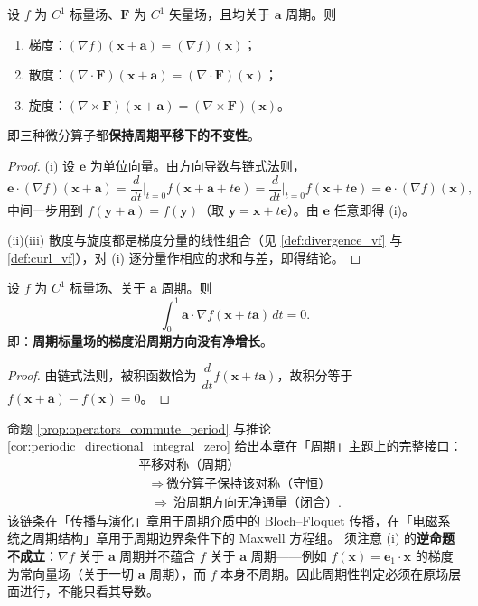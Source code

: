 \begin{proposition}[三种微分算子与周期平移交换]\label{prop:operators_commute_period}
设 $f$ 为 $C^1$ 标量场、$\mathbf F$ 为 $C^1$ 矢量场，且均关于 $\mathbf a$ 周期。则
\begin{enumerate}[label=(\roman*)]
    \item 梯度：$(\nabla f)(\mathbf x+\mathbf a)=(\nabla f)(\mathbf x)$；
    \item 散度：$(\nabla\cdot\mathbf F)(\mathbf x+\mathbf a)=(\nabla\cdot\mathbf F)(\mathbf x)$；
    \item 旋度：$(\nabla\times\mathbf F)(\mathbf x+\mathbf a)=(\nabla\times\mathbf F)(\mathbf x)$。
\end{enumerate}
即三种微分算子都\textbf{保持周期平移下的不变性}。
\end{proposition}

\begin{proof}
(i) 设 $\mathbf e$ 为单位向量。由方向导数与链式法则，
\[
\mathbf e\cdot(\nabla f)(\mathbf x+\mathbf a)
=\frac{d}{dt}\Big|_{t=0}f(\mathbf x+\mathbf a+t\mathbf e)
=\frac{d}{dt}\Big|_{t=0}f(\mathbf x+t\mathbf e)
=\mathbf e\cdot(\nabla f)(\mathbf x),
\]
中间一步用到 $f(\mathbf y+\mathbf a)=f(\mathbf y)$（取 $\mathbf y=\mathbf x+t\mathbf e$）。由 $\mathbf e$ 任意即得 (i)。

(ii)(iii) 散度与旋度都是梯度分量的线性组合（见 \cref{def:divergence_vf} 与 \cref{def:curl_vf}），对 (i) 逐分量作相应的求和与差，即得结论。
\end{proof}

\begin{corollary}[沿周期方向的线积分为零]\label{cor:periodic_directional_integral_zero}
设 $f$ 为 $C^1$ 标量场、关于 $\mathbf a$ 周期。则
\[
\int_0^{1}\mathbf a\cdot\nabla f(\mathbf x+t\mathbf a)\,dt=0 .
\]
即：\textbf{周期标量场的梯度沿周期方向没有净增长}。
\end{corollary}

\begin{proof}
由链式法则，被积函数恰为 $\dfrac{d}{dt}f(\mathbf x+t\mathbf a)$，故积分等于 $f(\mathbf x+\mathbf a)-f(\mathbf x)=0$。
\end{proof}

\begin{remark}[与「周期」主题的接口]\label{rem:vf_period_interface}
命题 \ref{prop:operators_commute_period} 与推论 \ref{cor:periodic_directional_integral_zero} 给出本章在「周期」主题上的完整接口：
\[
\begin{aligned}
&\text{平移对称（周期）}\\
&\quad\Longrightarrow\ \text{微分算子保持该对称（守恒）}\\
&\quad\Longrightarrow\ \text{沿周期方向无净通量（闭合）}.
\end{aligned}
\]
该链条在「传播与演化」章用于周期介质中的 Bloch--Floquet 传播，在「电磁系统之周期结构」章用于周期边界条件下的 Maxwell 方程组。
须注意 (i) 的\textbf{逆命题不成立}：$\nabla f$ 关于 $\mathbf a$ 周期并不蕴含 $f$ 关于 $\mathbf a$ 周期——例如 $f(\mathbf x)=\mathbf e_1\cdot\mathbf x$ 的梯度为常向量场（关于一切 $\mathbf a$ 周期），而 $f$ 本身不周期。因此周期性判定必须在原场层面进行，不能只看其导数。
\end{remark}


